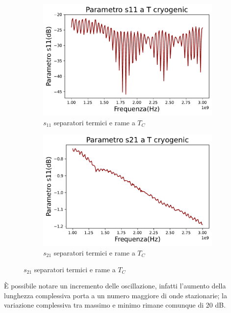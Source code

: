 \begin{figure}[H]
\centering

\begin{subfigure}{0.49\textwidth}
	\includegraphics[width=\textwidth]{S11_TC_rame.pdf}
    \caption{$s_{11}$ separatori termici e rame a $T_{C}$}
    \label{fig:sub1}
\end{subfigure}
\hfill
\begin{subfigure}{0.49\textwidth}
    \includegraphics[width=\textwidth]{S21_TC_rame.pdf}
    \caption{$s_{21}$ separatori termici e rame a $T_{C}$}
    \label{fig:sub2}
\end{subfigure}

\end{figure}

\`E possibile notare un incremento delle oscillazione, infatti l'aumento della lunghezza complessiva porta a un numero maggiore di onde stazionarie; la variazione complessiva tra massimo e minimo rimane comunque di 20 dB.


